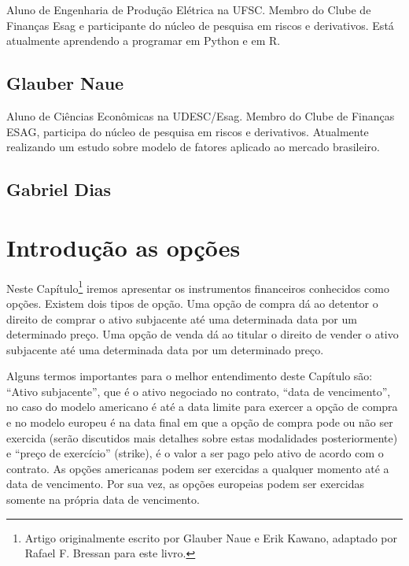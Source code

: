 \documentclass[]{book}
\let\rmarkdownfootnote\footnote%
\def\footnote{\protect\rmarkdownfootnote}
\theoremstyle{definition}
\theoremstyle{definition}
\theoremstyle{definition}
\theoremstyle{remark}
\begin{document}
Aluno de Engenharia de Produção Elétrica na UFSC. Membro do Clube de Finanças Esag e participante do núcleo de pesquisa em riscos e derivativos. Está atualmente aprendendo a programar em Python e em R.

\hypertarget{glauber-naue}{%
\section*{Glauber Naue}\label{glauber-naue}}

Aluno de Ciências Econômicas na UDESC/Esag. Membro do Clube de Finanças ESAG, participa do núcleo de pesquisa em riscos e derivativos. Atualmente realizando um estudo sobre modelo de fatores aplicado ao mercado brasileiro.

\hypertarget{gabriel-dias}{%
\section*{Gabriel Dias}\label{gabriel-dias}}

\hypertarget{opcoes}{%
\chapter{Introdução as opções}\label{opcoes}}

Neste Capítulo\footnote{Artigo originalmente escrito por Glauber Naue e Erik Kawano, adaptado por Rafael F. Bressan para este livro.} iremos apresentar os instrumentos financeiros conhecidos como opções. Existem dois tipos de opção. Uma opção de compra dá ao detentor o direito de comprar o ativo subjacente até uma determinada data por um determinado preço. Uma opção de venda dá ao titular o direito de vender o ativo subjacente até uma determinada data por um determinado preço.

Alguns termos importantes para o melhor entendimento deste Capítulo são: ``Ativo subjacente'', que é o ativo negociado no contrato, ``data de vencimento'', no caso do modelo americano é até a data limite para exercer a opção de compra e no modelo europeu é na data final em que a opção de compra pode ou não ser exercida (serão discutidos mais detalhes sobre estas modalidades posteriormente) e ``preço de exercício'' (strike), é o valor a ser pago pelo ativo de acordo com o contrato. As opções americanas podem ser exercidas a qualquer momento até a data de vencimento. Por sua vez, as opções europeias podem ser exercidas somente na própria data de vencimento.
\end{document}
